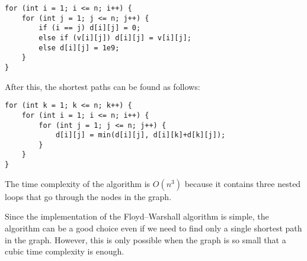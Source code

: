 \begin{lstlisting}
for (int i = 1; i <= n; i++) {
    for (int j = 1; j <= n; j++) {
        if (i == j) d[i][j] = 0;
        else if (v[i][j]) d[i][j] = v[i][j];
        else d[i][j] = 1e9;
    }
}
\end{lstlisting}

After this, the shortest paths can be found as follows:

\begin{lstlisting}
for (int k = 1; k <= n; k++) {
    for (int i = 1; i <= n; i++) {
        for (int j = 1; j <= n; j++) {
            d[i][j] = min(d[i][j], d[i][k]+d[k][j]);
        }
    }
}
\end{lstlisting}

The time complexity of the algorithm is $O(n^3)$
because it contains three nested loops
that go through the nodes in the graph.

Since the implementation of the Floyd–Warshall
algorithm is simple, the algorithm can be
a good choice even if we need to find only a
single shortest path in the graph.
However, this is only possible when the graph
is so small that a cubic time complexity is enough.